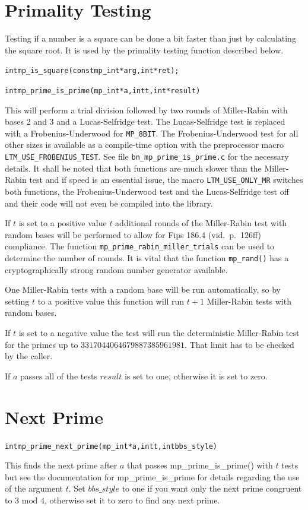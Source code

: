 \documentclass[synpaper]{book}
\begin{document}
\section{Primality Testing}
Testing if a number is a square can be done a bit faster than just by calculating the square root. It is used by the primality testing function described below.
\begin{alltt}
int mp_is_square(const mp_int *arg, int *ret);
\end{alltt}

\begin{alltt}
int mp_prime_is_prime (mp_int * a, int t, int *result)
\end{alltt}
This will perform a trial division followed by two rounds of Miller-Rabin with bases 2 and 3 and a Lucas-Selfridge test. The Lucas-Selfridge test is replaced with a Frobenius-Underwood for \texttt{MP\_8BIT}. The Frobenius-Underwood test for all other sizes is available as a compile-time option with the preprocessor macro \texttt{LTM\_USE\_FROBENIUS\_TEST}. See file
\texttt{bn\_mp\_prime\_is\_prime.c} for the necessary details. It shall be noted that both functions are much slower than
the Miller-Rabin test and if speed is an essential issue, the macro \texttt{LTM\_USE\_ONLY\_MR} switches both functions, the Frobenius-Underwood test and the Lucas-Selfridge test off and their code will not even be compiled into the library.

If $t$ is set to a positive value $t$ additional rounds of the Miller-Rabin test with random bases will be performed to allow for Fips 186.4 (vid.~p.~126ff) compliance. The function \texttt{mp\_prime\_rabin\_miller\_trials} can be used to determine the number of rounds. It is vital that the function \texttt{mp\_rand()} has a cryptographically strong random number generator available.

One Miller-Rabin tests with a random base will be run automatically, so by setting $t$ to a positive value this function will run $t + 1$ Miller-Rabin tests with random bases.

If  $t$ is set to a negative value the test will run the deterministic Miller-Rabin test for the primes up to $3317044064679887385961981$. That limit has to be checked by the caller.

If $a$ passes all of the tests $result$ is set to one, otherwise it is set to zero.

\section{Next Prime}
\begin{alltt}
int mp_prime_next_prime(mp_int *a, int t, int bbs_style)
\end{alltt}
This finds the next prime after $a$ that passes mp\_prime\_is\_prime() with $t$ tests but see the documentation for
mp\_prime\_is\_prime for details regarding the use of the argument $t$.  Set $bbs\_style$ to one if you
want only the next prime congruent to $3 \mbox{ mod } 4$, otherwise set it to zero to find any next prime.
\end{document}
